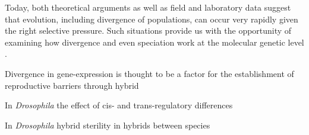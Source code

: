Today, both theoretical arguments as well as field and laboratory data
suggest that evolution, including divergence of populations, can occur
very rapidly given the right selective pressure. Such situations
provide us with the opportunity of examining how divergence and even
speciation work at the molecular genetic level
\cite{via_ecological_2002} .

Divergence in gene-expression is thought to be a factor for the
establishment of reproductive barriers through hybrid

In \textit{Drosophila} the effect of cis- and trans-regulatory
differences \cite{pmid20354124}

In \textit{Drosophila} hybrid sterility in hybrids between species
\cite{pmid16757655}




     